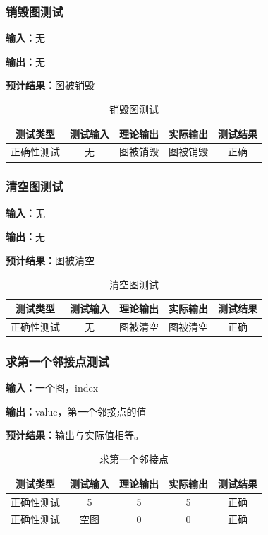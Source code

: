 \subsubsection{销毁图测试}
\textbf{输入：}无
\par
\textbf{输出：}无
\par
\textbf{预计结果：}图被销毁
\begin{table}[h]
\caption{销毁图测试}
\centering
\begin{tabular}{@{}ccccc@{}}
\toprule
\multicolumn{1}{c}{测试类型}    & \multicolumn{1}{c}{测试输入} & \multicolumn{1}{c}{理论输出} & \multicolumn{1}{c}{实际输出} & \multicolumn{1}{c}{测试结果} \\ \midrule
\multicolumn{1}{c|}{正确性测试}  & 无&图被销毁&图被销毁&正确\\ \bottomrule
\end{tabular}
\label{tab:destorytest4}
\end{table}


\subsubsection{清空图测试}
\textbf{输入：}无
\par
\textbf{输出：}无
\par
\textbf{预计结果：}图被清空
\begin{table}[h]
    \centering
    \caption{清空图测试}
    \begin{tabular}{@{}ccccc@{}}
        \toprule
        \multicolumn{1}{c}{测试类型}    & \multicolumn{1}{c}{测试输入} & \multicolumn{1}{c}{理论输出} & \multicolumn{1}{c}{实际输出} &
        \multicolumn{1}{c}{测试结果} \\ \midrule
        \multicolumn{1}{c|}{正确性测试}  &无 &图被清空&图被清空&正确\\ \bottomrule
    \end{tabular}
    \label{tab:cleartest4}
\end{table}


\subsubsection{求第一个邻接点测试}
\textbf{输入：}一个图，index
\par
\textbf{输出：}value，第一个邻接点的值
\par
\textbf{预计结果：}输出与实际值相等。
\begin{table}[h]
    \centering
    \caption{求第一个邻接点}
    \begin{tabular}{@{}ccccc@{}}
        \toprule
        \multicolumn{1}{c}{测试类型}    & \multicolumn{1}{c}{测试输入} & \multicolumn{1}{c}{理论输出} & \multicolumn{1}{c}{实际输出} &
        \multicolumn{1}{c}{测试结果} \\ \midrule
        \multicolumn{1}{c|}{正确性测试}  & 5&5&5&正确\\
        \multicolumn{1}{c|}{正确性测试}  & 空图&0&0&正确\\ \bottomrule
    \end{tabular}
    \label{tab:lengthtest4}
\end{table}


